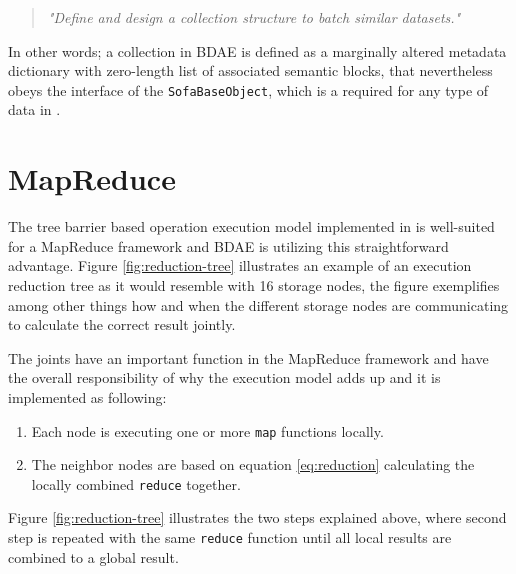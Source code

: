 \begin{quotation}
	\textit{"Define and design a collection structure to batch similar datasets."}
\end{quotation}

In other words; a collection in BDAE is defined as a marginally altered metadata dictionary with zero-length list of associated semantic blocks, that nevertheless obeys the interface of the \texttt{SofaBaseObject}, which is a required for any type of data in \CodeName.

\section{MapReduce}
The tree barrier based operation execution model implemented in \CodeName is well-suited for a MapReduce framework and BDAE is utilizing this straightforward advantage. Figure \ref{fig:reduction-tree} illustrates an example of an execution reduction tree as it would resemble with 16 storage nodes, the figure exemplifies among other things how and when the different storage nodes are communicating to calculate the correct result jointly.
\newline

The joints have an important function in the MapReduce framework and have the overall responsibility of why the execution model adds up and it is implemented as following:
\begin{enumerate}
	\item Each node is executing one or more \texttt{map} functions locally.
	\item The neighbor nodes are based on equation \ref{eq:reduction} calculating the locally combined \texttt{reduce} together.
\end{enumerate}

Figure \ref{fig:reduction-tree} illustrates the two steps explained above, where second step is repeated with the same \texttt{reduce} function until all local results are combined to a global result.

